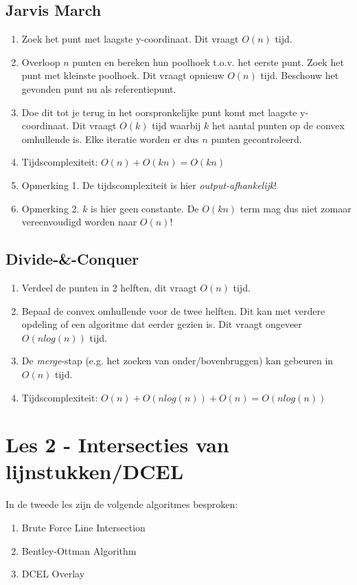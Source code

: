 \documentclass[12pt,a4paper]{article}
\begin{document}
		\subsection{Jarvis March}
			\begin{enumerate}
				\item Zoek het punt met laagste y-coordinaat. Dit vraagt $O(n)$ tijd.
				\item Overloop $n$ punten en bereken hun poolhoek t.o.v. het eerste punt. Zoek het punt met kleinste poolhoek. Dit vraagt opnieuw $O(n)$ tijd. Beschouw het gevonden punt nu als referentiepunt.
				\item Doe dit tot je terug in het oorspronkelijke punt komt met laagste y-coordinaat. Dit vraagt $O(k)$ tijd waarbij $k$ het aantal punten op de convex omhullende is. Elke iteratie worden er dus $n$ punten gecontroleerd.
				\item Tijdscomplexiteit: $O(n) + O(kn) = O(kn)$
				\item Opmerking 1. De tijdscomplexiteit is hier \emph{output-afhankelijk}!
				\item Opmerking 2. $k$ is hier geen constante. De $O(kn)$ term mag dus niet zomaar vereenvoudigd worden naar $O(n)$!
			\end{enumerate}
		
		\subsection{Divide-\&-Conquer}
			\begin{enumerate}
				\item Verdeel de punten in 2 helften, dit vraagt $O(n)$ tijd. 
				\item Bepaal de convex omhullende voor de twee helften. Dit kan met verdere opdeling of een algoritme dat eerder gezien is. Dit vraagt ongeveer $O(n log (n))$ tijd.
				\item De \emph{merge}-stap (e.g. het zoeken van onder/bovenbruggen) kan gebeuren in $O(n)$ tijd. 
				\item Tijdscomplexiteit: $O(n) + O(n log (n)) + O(n) = O(n log (n))$
			\end{enumerate}
	\section{Les 2 - Intersecties van lijnstukken/DCEL}
		In de tweede les zijn de volgende algoritmes besproken:
		\begin{enumerate}
			\item Brute Force Line Intersection
			\item Bentley-Ottman Algorithm
			\item DCEL Overlay
		\end{enumerate}
	
\end{document}
